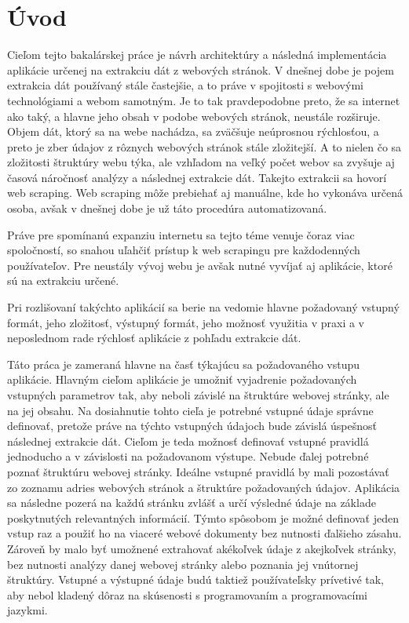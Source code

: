 \chapter{Úvod}

Cieľom tejto bakalárskej práce je návrh architektúry a následná implementácia aplikácie určenej na extrakciu dát z webových stránok. V dnešnej dobe je pojem extrakcia dát používaný stále častejšie, a to práve v spojitosti s webovými technológiami a webom samotným. Je to tak pravdepodobne preto, že sa internet ako taký, a hlavne jeho obsah v podobe webových stránok, neustále rozširuje. Objem dát, ktorý sa na webe nachádza, sa zväčšuje neúprosnou rýchlosťou, a preto je zber údajov z rôznych webových stránok stále zložitejší. A to nielen čo sa zložitosti štruktúry webu týka, ale vzhľadom na veľký počet webov sa zvyšuje aj časová náročnosť analýzy a následnej extrakcie dát. Takejto extrakcii sa hovorí web scraping. Web scraping môže prebiehať aj manuálne, kde ho vykonáva určená osoba, avšak v dnešnej dobe je už táto procedúra automatizovaná.

Práve pre spomínanú expanziu internetu sa tejto téme venuje čoraz viac spoločností, so snahou uľahčiť prístup k web scrapingu pre každodenných používateľov. Pre neustály vývoj webu je avšak nutné vyvíjať aj aplikácie, ktoré sú na extrakciu určené. 

Pri rozlišovaní takýchto aplikácií sa berie na vedomie hlavne požadovaný vstupný formát, jeho zložitosť, výstupný formát, jeho možnosť využitia v praxi a v neposlednom rade rýchlosť aplikácie z pohľadu extrakcie dát. 

Táto práca je zameraná hlavne na časť týkajúcu sa požadovaného vstupu aplikácie. Hlavným cieľom aplikácie je umožniť vyjadrenie požadovaných vstupných parametrov tak, aby neboli závislé na štruktúre webovej stránky, ale na jej obsahu. Na dosiahnutie tohto cieľa je potrebné vstupné údaje správne definovať, pretože práve na týchto vstupných údajoch bude závislá úspešnosť následnej extrakcie dát. Cieľom je teda možnosť definovať vstupné pravidlá jednoducho a v závislosti na požadovanom výstupe. Nebude ďalej potrebné poznať štruktúru webovej stránky. Ideálne vstupné pravidlá by mali pozostávať zo zoznamu adries webových stránok a štruktúre požadovaných údajov. Aplikácia sa následne pozerá na každú stránku zvlášť a určí výsledné údaje na základe poskytnutých relevantných informácií. Týmto spôsobom je možné definovať jeden vstup raz a použiť ho na viaceré webové dokumenty bez nutnosti ďalšieho zásahu. Zároveň by malo byť umožnené extrahovať akékoľvek údaje z akejkoľvek stránky, bez nutnosti analýzy danej webovej stránky alebo poznania jej vnútornej štruktúry. Vstupné a výstupné údaje budú taktiež používateľsky prívetivé tak, aby nebol kladený dôraz na skúsenosti s programovaním a programovacími jazykmi.

